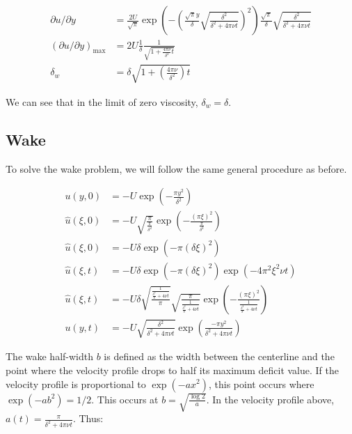 \documentclass{article}
\begin{document}
\begin{align}
\partial u / \partial y & = \frac{2 U}{\sqrt{\pi}} 
	\exp \left( - \left( \frac{ \sqrt{\pi} y}{\delta} 
	\sqrt{ \frac{\delta^2}{\delta^2 + 4 \pi \nu t}} \right)^2 \right) 
	\frac{ \sqrt{\pi}}{\delta} 
	\sqrt{ \frac{\delta^2}{\delta^2 + 4 \pi \nu t}} \nonumber \\
\left( \partial u / \partial y \right)_\text{max} & =
	2 U \frac{1}{\delta} \frac{1}{\sqrt{1 + \frac{4 \pi \nu}{\delta^2} t}}\\
\delta_w & = \delta \sqrt{ 1 + \left( \frac{4 \pi \nu}{\delta^2} \right) t } 
\end{align}

We can see that in the limit of zero viscosity, $\delta_w = \delta$.

\subsection{Wake}

To solve the wake problem, we will follow the same general procedure
	as before.

\begin{align}
u(y,0) & = -U\exp\left(-\frac{\pi y^2}{\delta^2} \right)\\
\hat{u}(\xi, 0) & = - U \sqrt{ \frac{\pi}{\frac{\pi}{\delta^2}}}
	\exp \left( - \frac{ (\pi \xi)^2}{ \frac{\pi}{\delta^2}} \right)
	\nonumber \\
\hat{u}(\xi, 0)& = - U \delta \exp \left( - 
	\pi \left( \delta \xi \right)^2 \right) \\	
\hat{u}(\xi, t) & = - U \delta 
	\exp \left( - \pi \left( \delta \xi \right)^2 \right)
	\exp \left( - 4 \pi^2 \xi^2 \nu t \right) \nonumber\\
\hat{u}(\xi, t) & = - U \delta
	\sqrt{ \frac{\frac{1}{ \frac{\delta^2}{\pi} + 4 \nu t}}{\pi}}
	\sqrt{ \frac{\pi}{ \frac{1}{ \frac{\delta^2}{\pi} + 4 \nu t}}}
	\exp \left( - \frac{ ( \pi \xi )^2}
	{ \frac{1}{ \frac{\delta^2}{\pi} + 4 \nu t}} \right) \nonumber\\
u(y, t) & = - U \sqrt{ \frac{\delta^2}{ \delta^2 + 4 \pi \nu t}}
	\exp \left( \frac{-\pi y^2}{ \delta^2 + 4 \pi \nu t} \right)
\end{align}

The wake half-width $b$ is defined as the width between the centerline
	and the point where the velocity profile drops to half its
	maximum deficit value.
If the velocity profile is proportional to $\exp(-a x^2)$, this point occurs
	where $\exp(-a b^2) = 1/2$.  
This occurs at $b = \sqrt{\frac{\log 2}{a}}$.
In the velocity profile above, $a(t) = \frac{\pi}{\delta^2 + 4 \pi \nu t}$.
Thus:
\end{document}
